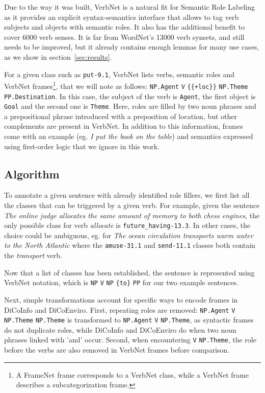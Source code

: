 Due to the way it was built, VerbNet is a natural fit for Semantic Role
Labeling as it provides an explicit syntax-semantics interface that allows to
tag verb subjects and objects with semantic roles. It also has the additional
benefit to cover 6000 verb senses. It is far from WordNet's 13000 verb synsets,
and still needs to be improved, but it already contains enough lemmas for many
use cases, as we show in section~\ref{sec:results}.

For a given class such as \texttt{put-9.1}, VerbNet lists verbs, semantic roles
and VerbNet frames\footnote{A FrameNet frame corresponds to a VerbNet class,
while a VerbNet frame describes a subcategorization frame.}, that we will note
as follows: \texttt{NP.Agent} \texttt{V} \texttt{\{\{+loc\}\}}
\texttt{NP.Theme} \texttt{PP.Destination}. In this case, the subject of the
verb is \texttt{Agent}, the first object is \texttt{Goal} and the second one is
\texttt{Theme}. Here, roles are filled by two noun phrases and a prepositional phrase
introduced with a preposition of location, but other complements are present in
VerbNet. In addition to this information, frames come with an example (eg.
\textit{I put the book on the table}) and semantics expressed using first-order
logic that we ignore in this work.

\subsection{Algorithm}

To annotate a given sentence with already identified role fillers, we first
list all the classes that can be triggered by a given verb. For example, given
the sentence \emph{The online judge allocates the same amount of memory to both
chess engines}, the only possible class for verb \emph{allocate} is
\texttt{future\_having-13.3}. In other cases, the choice could be ambiguous,
eg. for \emph{The ocean circulation transports warm water to the North Atlantic}
where the \texttt{amuse-31.1} and \texttt{send-11.1} classes both contain the
\textit{transport} verb.

Now that a list of classes has been established, the sentence is represented
using VerbNet notation, which is \texttt{NP} \texttt{V} \texttt{NP}
\texttt{\{to\}} \texttt{PP} for our two example sentences.

Next, simple transformations account for specific ways to encode frames in
DiCoInfo and DiCoEnviro. First, repeating roles are removed: \texttt{NP.Agent}
\texttt{V} \texttt{NP.Theme} \texttt{NP.Theme} is transformed to
\texttt{NP.Agent} \texttt{V} \texttt{NP.Theme}, as syntactic frames do not
duplicate roles, while DiCoInfo and DiCoEnviro do when two noun phrases linked
with 'and' occur. Second, when encountering \texttt{V} \texttt{NP.Theme}, the
role before the verbs are also removed in VerbNet frames before comparison.

